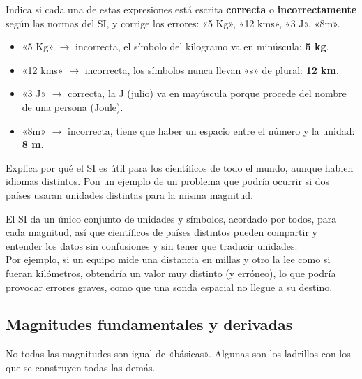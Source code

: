 \begin{exercise}
    Indica si cada una de estas expresiones está escrita \textbf{correcta} o \textbf{incorrectamente} según las normas del SI, y corrige los errores: «5 Kg», «12 kms», «3 J», «8m».
    \begin{solu}
        \begin{itemize}
            \item «5 Kg» \(\to\) incorrecta, el símbolo del kilogramo va en minúscula: \textbf{5 kg}.
            \item «12 kms» \(\to\) incorrecta, los símbolos nunca llevan «s» de plural: \textbf{12 km}.
            \item «3 J» \(\to\) correcta, la J (julio) va en mayúscula porque procede del nombre de una persona (Joule).
            \item «8m» \(\to\) incorrecta, tiene que haber un espacio entre el número y la unidad: \textbf{8 m}.
        \end{itemize}
    \end{solu}
\end{exercise}

\begin{exercise}
    Explica por qué el SI es útil para los científicos de todo el mundo, aunque hablen idiomas distintos. Pon un ejemplo de un problema que podría ocurrir si dos países usaran unidades distintas para la misma magnitud.
    \begin{solu}
        El SI da un único conjunto de unidades y símbolos, acordado por todos, para cada magnitud, así que científicos de países distintos pueden compartir y entender los datos sin confusiones y sin tener que traducir unidades. \\
        Por ejemplo, si un equipo mide una distancia en millas y otro la lee como si fueran kilómetros, obtendría un valor muy distinto (y erróneo), lo que podría provocar errores graves, como que una sonda espacial no llegue a su destino.
    \end{solu}
\end{exercise}


\subsection{Magnitudes fundamentales y derivadas}

No todas las magnitudes son igual de «básicas». Algunas son los ladrillos con los que se construyen todas las demás.

